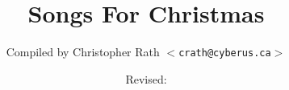 \documentclass[12pt,legalpaper]{book}
\title{Songs For Christmas}
\author{Compiled by Christopher Rath $<$\texttt{crath@cyberus.ca}$>$}
\date{Revised: \RevDate}
\begin{document}
\SBDefaultFont

\frontmatter

\mainmatter
\ifWordBk
  \twocolumn
\fi


\mainmatter
\ifWordBk
  \twocolumn
\fi




\end{document}
